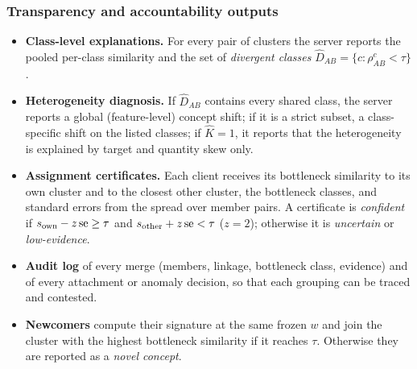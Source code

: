 \subsubsection{Transparency and accountability outputs}\label{sec:outputs}
\begin{itemize}[leftmargin=*,itemsep=1pt]
\item \textbf{Class-level explanations.} For every pair of clusters the server reports the pooled per-class similarity and the set of \emph{divergent classes} $\hat D_{AB}=\{c:\rho^c_{AB}<\tau\}$.
\item \textbf{Heterogeneity diagnosis.} If $\hat D_{AB}$ contains every shared class, the server reports a global (feature-level) concept shift; if it is a strict subset, a class-specific shift on the listed classes; if $\hat K=1$, it reports that the heterogeneity is explained by target and quantity skew only.
\item \textbf{Assignment certificates.} Each client receives its bottleneck similarity to its own cluster and to the closest other cluster, the bottleneck classes, and standard errors from the spread over member pairs. A certificate is \emph{confident} if $s_{\rm own}-z\,\mathrm{se}\ge\tau$ and $s_{\rm other}+z\,\mathrm{se}<\tau$ ($z=2$); otherwise it is \emph{uncertain} or \emph{low-evidence}.
\item \textbf{Audit log} of every merge (members, linkage, bottleneck class, evidence) and of every attachment or anomaly decision, so that each grouping can be traced and contested.
\item \textbf{Newcomers} compute their signature at the same frozen $w$ and join the cluster with the highest bottleneck similarity if it reaches $\tau$. Otherwise they are reported as a \emph{novel concept}.
\end{itemize}

